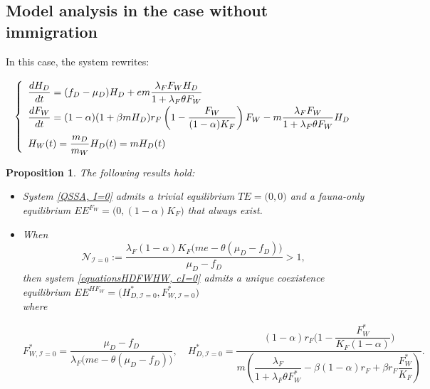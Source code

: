 \documentclass{article}
\newcommand{\lfw}{\lambda_{F}}
\newcommand{\lfw}{\lambda_{F}}
\newcommand{\cI}{\mathcal{I}}
\newtheorem{prop}{Proposition}
\begin{document}
\subsection{Model analysis in the case without immigration}
In this case, the system rewrites:

\begin{equation}
\def\arraystretch{2}
\left\lbrace \begin{array}{l}
\dfrac{dH_D}{dt} = (f_D - \mu_D) H_D + e m \dfrac{\lfw F_W H_D}{1 + \lfw \theta F_W} \\
\dfrac{dF_W}{dt} = (1-\alpha) (1+\beta m H_D) r_F \left(1 - \dfrac{F_W}{(1-\alpha)K_F} \right) F_W - m \dfrac{\lfw F_W}{1 + \lfw \theta F_W} H_D \\
H_W(t) = \dfrac{m_D}{m_W} H_D(t) = m H_D(t)
\end{array} \right.
\label{QSSA, I=0}
\end{equation}

\begin{prop}
\label{theoremEquilibre, I=0}
The following results hold:
\begin{itemize}
\item System \eqref{QSSA, I=0} admits a trivial equilibrium $TE = \Big(0,0\Big)$ and a fauna-only equilibrium $EE^{F_W}=\Big(0, (1-\alpha)K_F \Big)$ that always exist.

\item When
$$
\mathcal{N}_{\cI = 0} := \dfrac{\lfw (1-\alpha)K_F\big(me - \theta (\mu_D - f_D) \big)}{\mu_D - f_D} >1,
$$ 
then system \eqref{equationsHDFWHW, cI=0} admits a unique coexistence equilibrium $EE^{HF_W} = \Big(H^*_{D, \cI = 0}, F^*_{W, \cI = 0}\Big)$ \\ 
where 

$$
F^*_{W, \cI = 0} = \dfrac{\mu_D - f_D}{\lfw \big(me - \theta (\mu_D - f_D) \big)  },
\quad 
H^*_{D, \cI = 0} = \dfrac{(1-\alpha)r_F\Big(1 - \dfrac{F^*_{W}}{K_F(1-\alpha)} \Big)}{m\left(\dfrac{\lfw}{1 + \lfw \theta F_W^*} - \beta (1-\alpha) r_F + \beta r_F  \dfrac{F^*_{W}}{K_F}\right)}
.$$
\end{itemize}
\end{prop}
\end{document}
